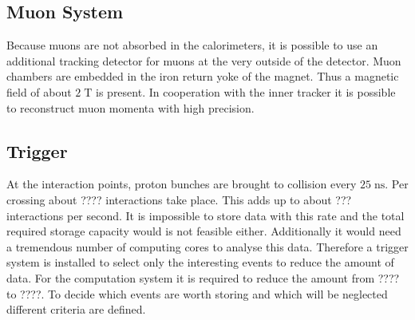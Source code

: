 \subsection{Muon System}
\label{sec:muonsystem}
	Because muons are not absorbed in the calorimeters, it is possible to use an additional tracking detector for muons at the very outside of the detector. Muon chambers are embedded in the iron return yoke of the magnet. Thus a magnetic field of about $2\;\text{T}$ is present.
	In cooperation with the inner tracker it is possible to reconstruct muon momenta with high precision.
\subsection{Trigger}
	At the interaction points, proton bunches are brought to collision every $25\;\text{ns}$. Per crossing about ????
	interactions take place. This adds up to about ???
	interactions per second. It is impossible to store data with this rate and the total required storage capacity would is not feasible either. Additionally it would need a tremendous number of computing cores to analyse this data. Therefore a trigger system is installed to select only the interesting events to reduce the amount of data. For the computation system it is required to reduce the amount from ???? to ????.
 	To decide which events are worth storing and which will be neglected different criteria are defined.
	
	